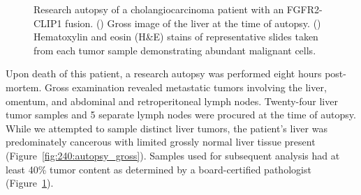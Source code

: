 \begin{figure}[htp]
\begin{subfigure}{0.7\textwidth}
        \caption{}\label{fig:240:histo}
    \end{subfigure}
    \caption[Research autopsy of a cholangiocarcinoma patient with an FGFR2-CLIP1 fusion.]{Research autopsy of a cholangiocarcinoma patient with an FGFR2-CLIP1 fusion. () Gross image of the liver at the time of autopsy. () Hematoxylin and eosin (H\&E) stains of representative slides taken from each tumor sample demonstrating abundant malignant cells.}
    \label{fig:240:autopsy}
\end{figure}
Upon death of this patient, a research autopsy was performed eight hours post-mortem. Gross examination revealed metastatic tumors involving the liver, omentum, and abdominal and retroperitoneal lymph nodes. Twenty-four liver tumor samples and 5 separate lymph nodes were procured at the time of autopsy. While we attempted to sample distinct liver tumors, the patient's liver was predominately cancerous with limited grossly normal liver tissue present (Figure~\ref{fig:240:autopsy_gross}). Samples used for subsequent analysis had at least 40\% tumor content as determined by a board-certified pathologist (Figure~\ref{fig:240:histo}).

